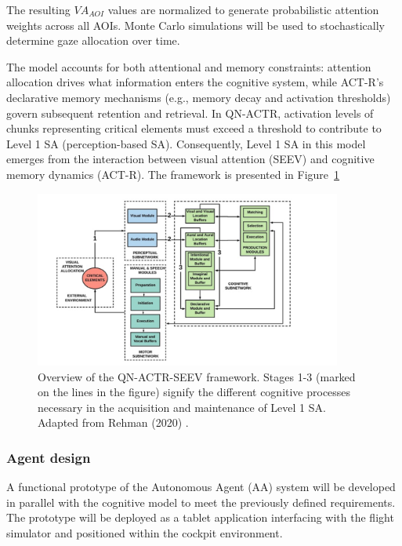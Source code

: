 \documentclass[12pt,a4paper]{article} %
\begin{document}
	The resulting $VA_{AOI}$ values are normalized to generate probabilistic attention weights across all AOIs. Monte Carlo simulations will be used to stochastically determine gaze allocation over time.
	
	The model accounts for both attentional and memory constraints: attention allocation drives what information enters the cognitive system, while ACT-R's declarative memory mechanisms (e.g., memory decay and activation thresholds) govern subsequent retention and retrieval. In QN-ACTR, activation levels of chunks representing critical elements must exceed a threshold to contribute to Level 1 SA (perception-based SA). Consequently, Level 1 SA in this model emerges from the interaction between visual attention (SEEV) and cognitive memory dynamics (ACT-R). The framework is presented in Figure~\ref{fig:qn-actr-seev}

	\begin{figure}[H]
    \centering
    \includegraphics[width=0.9\textwidth]{./images/qn-actr-sa-synoptic.png}
    \caption{Overview of the QN-ACTR-SEEV framework. Stages 1-3 (marked on the lines in the figure) signify the different cognitive processes necessary in the acquisition and maintenance of Level 1 SA. Adapted from Rehman (2020) \parencite{rehman_phd_thesis}.}
    \label{fig:qn-actr-seev}
	\end{figure}

	\subsubsection{Agent design}
	A functional prototype of the Autonomous Agent (AA) system will be developed in parallel with the cognitive model to meet the previously defined requirements. The prototype will be deployed as a tablet application interfacing with the flight simulator and positioned within the cockpit environment.
\end{document}

